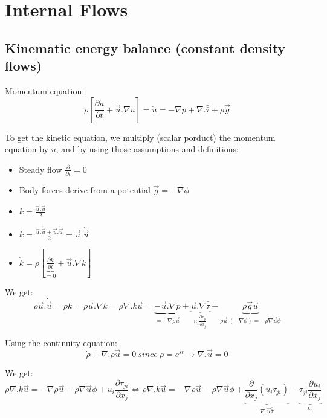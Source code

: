 

\chapter{Internal Flows}

\section{Kinematic energy balance (constant density flows)}

Momentum equation: 
\begin{equation}
\rho [\frac{\partial u}{\partial t}+ \vec{u}.\nabla u]=\dot{u}=- \nabla p + \nabla. \bar{\bar{\tau}} + \rho \vec{g}
\end{equation}

To get the kinetic equation, we multiply (scalar porduct) the momentum equation by $\bar{u}$, and by using those assumptions and definitions:

\begin{itemize}
\item Steady flow $\frac{\partial}{\partial t}=0$
\item Body forces derive from a potential $\vec{g}=-\nabla \phi$
\item $k=\frac{\vec{u}.\vec{u}}{2} $
\item $k=\frac{\vec{u}.\dot{\vec{u}}+\vec{u}.\dot{\vec{u}} }{2}= \vec{u}.\dot{\vec{u}} $
\item $\dot{k}=\rho [\underbrace{\frac{\partial k}{\partial t}}_{=0}+\vec{u}.\nabla k]$
\end{itemize}

We get:
\begin{equation}
\rho \vec{u} . \dot{\vec{u}}=\rho \dot{k}= \rho \vec{u}. \nabla k= \rho \nabla . k\vec{u}=\underbrace{- \vec{u}. \nabla p}_{=-\nabla \rho \vec{u}} + 
\underbrace{\vec{u}.  \nabla \bar{\bar{\tau}}}_{u_i \frac{\partial \tau_{ji}}{\partial x_j}}+
 \underbrace{\rho \vec{g} \vec{u}}_{\rho \vec{u}.(-\nabla \phi)=-\rho \nabla \vec{u} \phi}
\end{equation}

Using the continuity equation:
\begin{equation}
\dot{\rho}+\nabla.\rho \vec{u}=0 \ since \  \rho=c^{st} \rightarrow \nabla. \vec{u}=0
\end{equation}

We get:
\begin{equation}
\rho \nabla . k\vec{u}=-\nabla \rho \vec{u}- \rho \nabla \vec{u} \phi+ u_i \frac{\partial \tau_{ji}}{\partial x_j} \Leftrightarrow 
\rho \nabla . k\vec{u}=-\nabla \rho \vec{u}- \rho \nabla \vec{u} \phi+
\underbrace{\frac{\partial }{\partial x_j} (u_i \tau_{ji})}_{\nabla. \vec{u} \bar{\bar{\tau}}}- 
\underbrace{\tau_{ji} \frac{\partial u_i}{\partial x_j}}_{\epsilon_v}
\end{equation}

